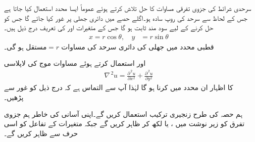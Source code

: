 سرحدی شرائط  کی جزوی تفرقی مساوات کا حل تلاش کرتے ہوئے  عموماً ایسا محدد استعمال کیا جاتا ہے جس کے لحاظ سے سرحد کی روپ سادہ ہو۔اگلے حصے میں دائری جھلی پر غور کیا جائے گا جس کو حل کرنے کے لیے  سود مند ثابت ہو گا جس کے متغیرات  اور  کی تعریف درج ذیل ہیں۔
\begin{align*}
x=r\cos \theta, \quad y&=r\sin \theta
\end{align*}
قطبی محدد میں جھلی کی  دائری سرحد کی مساوات 
$\text{مستقل}=r$
 ہو گی۔ 

 اور  استعمال کرتے ہوئے مساوات موج کی لاپلاسی
\begin{align*}
\nabla^{\,2}u=\frac{\partial^{\,2}u}{\partial x^2}+\frac{\partial^{\,2}u}{\partial y^2}
\end{align*}
کا اظہار ان محدد میں کرنا ہو گا لہٰذا آپ سے التماس ہے کہ درج ذیل کو غور سے پڑھیں۔

 ہم حصہ  کی طرح زنجیری ترکیب استعمال کریں گے۔اپنی آسانی کی خاطر ہم جزوی تفرق کو زیر نوشت میں ،  یا  لکھ کر ظاہر کریں گے جبکہ متغیرات   کے تفاعل  کو اسی حرف  سے ظاہر کریں گے۔


